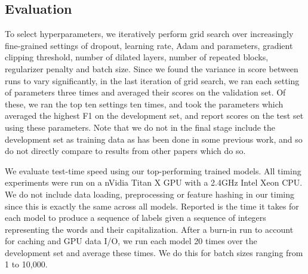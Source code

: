 \documentclass[11pt,letterpaper]{article}
\begin{document}
\subsection{Evaluation}

To select hyperparameters, we iteratively perform grid search over increasingly fine-grained settings of dropout, learning rate, Adam  and  parameters, gradient clipping threshold, number of dilated layers, number of repeated blocks, regularizer penalty and batch size. Since we found the variance in score between runs to vary significantly, in the last iteration of grid search, we ran each setting of parameters three times and averaged their scores on the validation set. Of these, we ran the top ten settings ten times, and took the parameters which averaged the highest F1 on the development set, and report scores on the test set using these parameters. Note that we do not in the final stage include the development set as training data as has been done in some previous work, and so do not directly compare to results from other papers which do so.

We evaluate test-time speed using our top-performing trained models. All timing experiments were run on a nVidia Titan X GPU with a 2.4GHz Intel Xeon CPU. We do not include data loading, preprocessing or feature hashing in our timing since this is exactly the same across all models. Reported is the time it takes for each model to produce a sequence of labels given a sequence of integers representing the words and their capitalization. After a burn-in run to account for caching and GPU data I/O, we run each model 20 times over the development set and average these times. We do this for batch sizes ranging from 1 to 10,000.  
\end{document}
